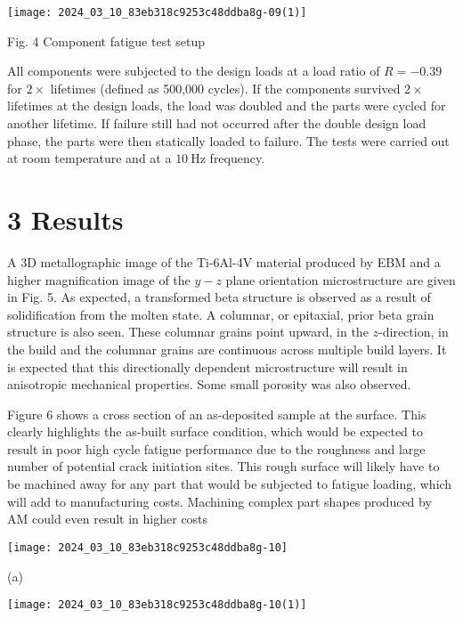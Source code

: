 \documentclass[10pt]{article}
\begin{document}
\begin{center}
\texttt{[image: 2024\_03\_10\_83eb318c9253c48ddba8g-09(1)]}
\end{center}

Fig. 4 Component fatigue test setup

All components were subjected to the design loads at a load ratio of $R=-0.39$ for $2 \times$ lifetimes (defined as 500,000 cycles). If the components survived $2 \times$ lifetimes at the design loads, the load was doubled and the parts were cycled for another lifetime. If failure still had not occurred after the double design load phase, the parts were then statically loaded to failure. The tests were carried out at room temperature and at a $10 \mathrm{~Hz}$ frequency.

\section*{3 Results}
A 3D metallographic image of the Ti-6Al-4V material produced by EBM and a higher magnification image of the $y-z$ plane orientation microstructure are given in Fig. 5. As expected, a transformed beta structure is observed as a result of solidification from the molten state. A columnar, or epitaxial, prior beta grain structure is also seen. These columnar grains point upward, in the $z$-direction, in the build and the columnar grains are continuous across multiple build layers. It is expected that this directionally dependent microstructure will result in anisotropic mechanical properties. Some small porosity was also observed.

Figure 6 shows a cross section of an as-deposited sample at the surface. This clearly highlights the as-built surface condition, which would be expected to result in poor high cycle fatigue performance due to the roughness and large number of potential crack initiation sites. This rough surface will likely have to be machined away for any part that would be subjected to fatigue loading, which will add to manufacturing costs. Machining complex part shapes produced by AM could even result in higher costs

\begin{center}
\texttt{[image: 2024\_03\_10\_83eb318c9253c48ddba8g-10]}
\end{center}

(a)

\begin{center}
\texttt{[image: 2024\_03\_10\_83eb318c9253c48ddba8g-10(1)]}
\end{center}
\end{document}
